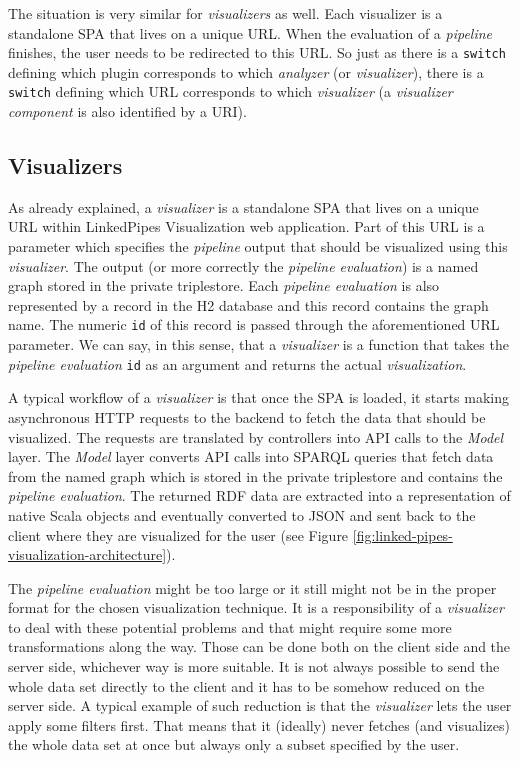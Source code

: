 The situation is very similar for \emph{visualizers} as well. Each visualizer is a standalone SPA that lives on a unique URL. When the evaluation of a \emph{pipeline} finishes, the user needs to be redirected to this URL. So just as there is a \texttt{switch} defining which plugin corresponds to which \emph{analyzer} (or \emph{visualizer}), there is a \texttt{switch} defining which URL corresponds to which \emph{visualizer} (a \emph{visualizer component} is also identified by a URI).

\subsection{Visualizers}
\label{sec:linkedpipes:visualizers}

As already explained, a \emph{visualizer} is a standalone SPA that lives on a unique URL within LinkedPipes Visualization web application. Part of this URL is a parameter which specifies the \emph{pipeline} output that should be visualized using this \emph{visualizer}. The output (or more correctly the \emph{pipeline evaluation})
is a named graph stored in the private triplestore. Each \emph{pipeline evaluation} is also represented by a record in the H2 database and this record contains the graph name. The numeric \texttt{id} of this record is passed through the aforementioned URL parameter. We can say, in this sense, that a \emph{visualizer} is a function that takes the \emph{pipeline evaluation} \texttt{id} as an argument and returns the actual \emph{visualization}.

A typical workflow of a \emph{visualizer} is that once the SPA is loaded, it starts making asynchronous HTTP requests to the backend to fetch the data that should be visualized. The requests are translated by controllers into API calls to the \emph{Model} layer.  The \emph{Model} layer converts API calls into SPARQL queries that fetch data from the named graph which is stored in the private triplestore and contains the \emph{pipeline evaluation}. The returned RDF data are extracted into a representation of native Scala objects and eventually converted to JSON and sent back to the client where they are visualized for the user (see Figure \ref{fig:linked-pipes-visualization-architecture}).

The \emph{pipeline evaluation} might be too large or it still might not be in the proper format for the chosen visualization technique. It is a responsibility of a \emph{visualizer} to deal with these potential problems and that might require some more transformations along the way. Those can be done both on the client side and the server side, whichever way is more suitable. It is not always possible to send the whole data set directly to the client and it has to be somehow reduced on the server side. A typical example of such reduction is that the \emph{visualizer} lets the user apply some filters first. That means that it (ideally) never fetches (and visualizes) the whole data set at once but always only a subset specified by the user. 